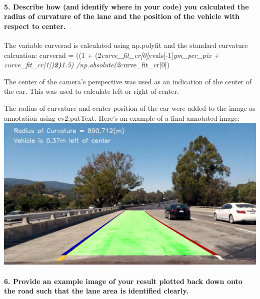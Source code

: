 \documentclass[11pt]{article}
\makeatletter
\def\maxwidth{\ifdim\Gin@nat@width>\linewidth\linewidth
    \else\Gin@nat@width\fi}
\let\Oldincludegraphics\includegraphics
\renewcommand{\includegraphics}[1]{\Oldincludegraphics[width=.8\maxwidth]{#1}}
\makeatother
\begin{document}
\hypertarget{describe-how-and-identify-where-in-your-code-you-calculated-the-radius-of-curvature-of-the-lane-and-the-position-of-the-vehicle-with-respect-to-center.}{%
\paragraph{5. Describe how (and identify where in your code) you
calculated the radius of curvature of the lane and the position of the
vehicle with respect to
center.}\label{describe-how-and-identify-where-in-your-code-you-calculated-the-radius-of-curvature-of-the-lane-and-the-position-of-the-vehicle-with-respect-to-center.}}

The variable curverad is calculated using np.polyfit and the standard
curvature calcuation: curverad = ((1 +
(2\emph{curve\_fit\_cr{[}0{]}}yvals{[}-1{]}\emph{ym\_per\_pix +
curve\_fit\_cr{[}1{]})\textbf{2)}1.5)
/np.absolute(2}curve\_fit\_cr{[}0{]})

The center of the camera's perspective was used as an indication of the
center of the car. This was used to calculate left or right of center.

The radius of curvature and center position of the car were added to the
image as annotation using cv2.putText. Here's an example of a final
annotated image: \includegraphics{./output_images/tracked_test1.jpg}

\hypertarget{provide-an-example-image-of-your-result-plotted-back-down-onto-the-road-such-that-the-lane-area-is-identified-clearly.}{%
\paragraph{6. Provide an example image of your result plotted back down
onto the road such that the lane area is identified
clearly.}\label{provide-an-example-image-of-your-result-plotted-back-down-onto-the-road-such-that-the-lane-area-is-identified-clearly.}}
\end{document}
